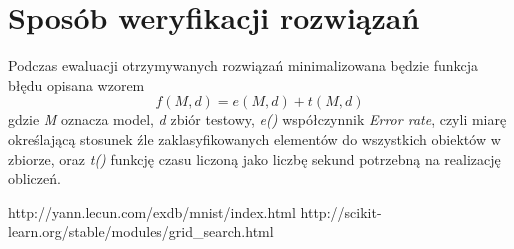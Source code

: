 \documentclass[]{report}
\begin{document}
\section{Sposób weryfikacji rozwiązań}

Podczas ewaluacji otrzymywanych rozwiązań minimalizowana będzie funkcja błędu opisana wzorem \[ f(M, d) = e(M, d) + t(M, d) \] gdzie \textit{M} oznacza model, \textit{d} zbiór testowy, \textit{e()} współczynnik \textit{Error rate}, czyli miarę określającą stosunek źle zaklasyfikowanych elementów do wszystkich obiektów w zbiorze, oraz \textit{t()} funkcję czasu liczoną jako liczbę sekund potrzebną na realizację obliczeń.

\begin{thebibliography}{9}
	 http://yann.lecun.com/exdb/mnist/index.html
	 http://scikit-learn.org/stable/modules/grid\_search.html
\end{thebibliography}
\end{document}
